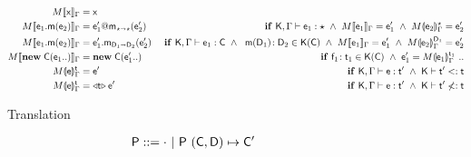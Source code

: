 \documentclass[sigconf]{acmart}
\begin{document}
\begin{figure*}[!t]
\center

\begin{center}
\begin{minipage}{10cm}
\begin{align*}
\TRG[M]{\x}\Env &= \x & \\
\TRG[M]{\Call{\e_1}\m{{\e_2}}}\Env &= \DynCall{\ep_1}\m{\ep_2} & 
   \IF\EM{\TypeCk{\K,\Env}{\e[1]}\any ~ \AND ~
    \TRG[M]{\e_1}\Env = \ep_1}
   \EM{~\AND~ \TAG[M]{\e_2}\Env{\any} = \ep_2}\\
\TRG[M]{\Call{\e_1}\m{{\e_2}}}\Env &= \KCall{\ep_1}\m{\ep_2}{\D[1]}{\D[2]} & 
    \IF\EM{\TypeCk{\K,\Env}{\e[1]}\C ~ \AND\; ~ 
    \Mtype\m{\D[1]}{\D[2]}\In\App\K\C}
  ~\EM{\AND ~ \TRG[M]{\e_1}\Env= \ep_1 
   ~\AND~ \TAG[M]{\e_2}\Env{\D[1]} = \ep_2}\\
\TRG[M]{\New\C{{\e_1}..}}\Env &= \New\C{\ep_1..} & 
   \IF\EM{\Ftype{\f[1]}{\t[1]}\In\App\K\C ~\AND~
     \ep[1] = \TAG[M]{\e[1]}\Env{\t[1]} ~..}\\
\TAG[M]{\e}{\Env}\t &= \e' & \IF\EM{\TypeCk{\K,\Env}\e\tp 
     ~\AND~ \K\vdash\tp\Sub\t}\\
\TAG[M]{\e}{\Env}\t &= \MonCast{\t}{\ep} & \IF\EM{\TypeCk{\K,\Env}\e\tp 
    ~\AND~ \K\vdash\tp\not\Sub\t}
\end{align*}
\end{minipage}
\end{center}

Translation

\begin{mathpar}
\end{mathpar}

\begin{align*}
\P &::= \cdot \B \P ~{{(\C,\D)}\mapsto\Cp}
\end{align*}


\begin{mathpar}






\end{mathpar}
\end{figure*}
\end{document}
